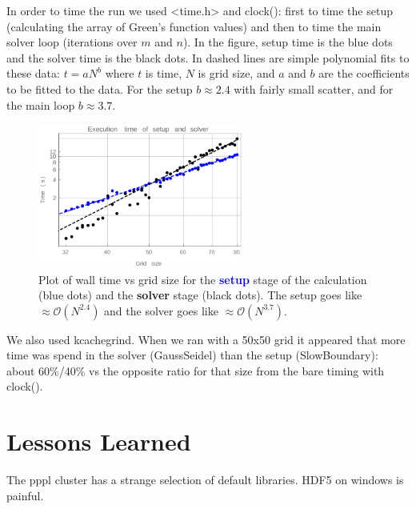 \documentclass[paper=letter, fontsize=11pt]{scrartcl} %
\begin{document}
In order to time the run we used <time.h> and clock(): first to time the setup (calculating the array of Green's function values) and then to time the main solver loop (iterations over $m$ and $n$). In the figure, setup time is the blue dots and the solver time is the black dots. In dashed lines are simple polynomial fits to these data: $t = a N^b$ where $t$ is time, $N$ is grid size, and $a$ and $b$ are the coefficients to be fitted to the data. For the setup $b \approx 2.4$ with fairly small scatter, and for the main loop $b \approx 3.7$.

\begin{figure}
	\centering
	\includegraphics[width=0.6\textwidth]{run_times.pdf}
	\caption{Plot of wall time vs grid size for the \textcolor{blue}{\textbf{setup}} stage of the calculation (blue dots) and the \textbf{solver} stage (black dots).  The setup goes like $\approx \mathcal{O}(N^{2.4})$ and the solver goes like $\approx \mathcal{O}(N^{3.7})$.}
\end{figure}

We also used kcachegrind. When we ran with a 50x50 grid it appeared that more time was spend in the solver (GaussSeidel) than the setup (SlowBoundary): about 60\%/40\% vs the opposite ratio for that size from the bare timing with clock(). 


\section{Lessons Learned}

The pppl cluster has a strange selection of default libraries.
HDF5 on windows is painful.
\end{document}
